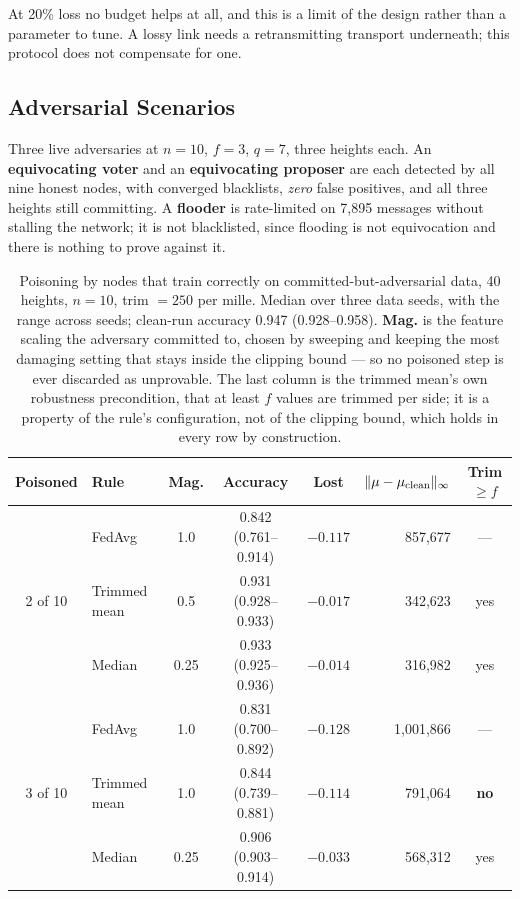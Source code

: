 \documentclass{llncs}
\begin{document}
At 20\% loss no budget helps at all, and this is a limit of the design rather
than a parameter to tune. A lossy link needs a retransmitting transport
underneath; this protocol does not compensate for one.

\subsection{Adversarial Scenarios}
\label{sec:eval-adversarial}

Three live adversaries at $n=10$, $f=3$, $q=7$, three heights each. An
\textbf{equivocating voter} and an \textbf{equivocating proposer} are each
detected by all nine honest nodes, with converged blacklists, \emph{zero} false
positives, and all three heights still committing. A \textbf{flooder} is
rate-limited on 7{,}895 messages without stalling the network; it is not
blacklisted, since flooding is not equivocation and there is nothing to prove
against it.

\begin{table}[t]
\centering
\caption{Poisoning by nodes that train correctly on committed-but-adversarial
data, 40 heights, $n=10$, trim $=250$ per mille. Median over three data seeds,
with the range across seeds; clean-run accuracy 0.947 (0.928--0.958).
\textbf{Mag.} is the feature scaling the adversary committed to, chosen by
sweeping and keeping the most damaging setting that stays inside the clipping
bound --- so no poisoned step is ever discarded as unprovable. The last column
is the trimmed mean's own robustness precondition, that at least $f$ values are
trimmed per side; it is a property of the rule's configuration, not of the
clipping bound, which holds in every row by construction.}
\label{tab:poison}
\begin{tabular}{clcccrc}
\toprule
\textbf{Poisoned} & \textbf{Rule} & \textbf{Mag.} & \textbf{Accuracy} &
\textbf{Lost} & $\|\mu - \mu_{\rm clean}\|_\infty$ & \textbf{Trim $\ge f$} \\
\midrule
\multirow{3}{*}{2 of 10}
 & FedAvg       & 1.0  & 0.842 (0.761--0.914) & $-0.117$ & 857{,}677 & --- \\
 & Trimmed mean & 0.5  & 0.931 (0.928--0.933) & $-0.017$ & 342{,}623 & yes \\
 & Median       & 0.25 & 0.933 (0.925--0.936) & $-0.014$ & 316{,}982 & yes \\
\midrule
\multirow{3}{*}{3 of 10}
 & FedAvg       & 1.0  & 0.831 (0.700--0.892) & $-0.128$ & 1{,}001{,}866 & --- \\
 & Trimmed mean & 1.0  & 0.844 (0.739--0.881) & $-0.114$ & 791{,}064 & \textbf{no} \\
 & Median       & 0.25 & 0.906 (0.903--0.914) & $-0.033$ & 568{,}312 & yes \\
\bottomrule
\end{tabular}
\end{table}
\end{document}
